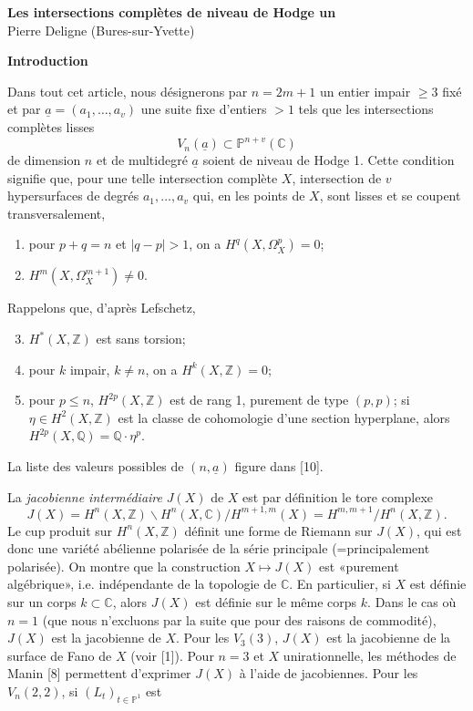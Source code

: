 \documentclass[10pt]{article}
\newcommand{\C}{\mathbb C}
\newcommand{\Pj}{\mathbb P}
\newcommand{\Q}{\mathbb Q}
\newcommand{\Z}{\mathbb Z}
\begin{document}
\fontsize{9.4}{11.15}\selectfont

\begin{center}
{\Large\bfseries Les intersections complètes de niveau de Hodge un}\\[0.45em]
Pierre Deligne (Bures-sur-Yvette)
\end{center}

\begin{center}\bfseries Introduction\end{center}

Dans tout cet article, nous désignerons par \(n=2m+1\) un entier impair \(\geq 3\) fixé et par \(\underline a=(a_1,\ldots,a_v)\) une suite fixe d'entiers \(>1\) tels que les intersections complètes lisses
\[
V_n(\underline a)\subset \Pj^{n+v}(\C)
\]
de dimension \(n\) et de multidegré \(\underline a\) soient de niveau de Hodge 1. Cette condition signifie que, pour une telle intersection complète \(X\), intersection de \(v\) hypersurfaces de degrés \(a_1,\ldots,a_v\) qui, en les points de \(X\), sont lisses et se coupent transversalement,
\begin{enumerate}[label=\alph*)]
\item pour \(p+q=n\) et \(|q-p|>1\), on a \(H^q(X,\Omega_X^p)=0\);
\item \(H^m(X,\Omega_X^{m+1})\ne0\).
\end{enumerate}
Rappelons que, d'après Lefschetz,
\begin{enumerate}[label=\alph*)]
\setcounter{enumi}{2}
\item \(H^*(X,\Z)\) est sans torsion;
\item pour \(k\) impair, \(k\ne n\), on a \(H^k(X,\Z)=0\);
\item pour \(p\le n\), \(H^{2p}(X,\Z)\) est de rang 1, purement de type \((p,p)\); si \(\eta\in H^2(X,\Z)\) est la classe de cohomologie d'une section hyperplane, alors \(H^{2p}(X,\Q)=\Q\cdot\eta^p\).
\end{enumerate}
La liste des valeurs possibles de \((n,\underline a)\) figure dans [10].

La \emph{jacobienne intermédiaire} \(J(X)\) de \(X\) est par définition le tore complexe
\[
J(X)=H^n(X,\Z)\backslash H^n(X,\C)/H^{m+1,m}(X)
     =H^{m,m+1}/H^n(X,\Z).
\]
Le cup produit sur \(H^n(X,\Z)\) définit une forme de Riemann sur \(J(X)\), qui est donc une variété abélienne polarisée de la série principale (=principalement polarisée). On montre que la construction \(X\mapsto J(X)\) est «purement algébrique», i.e. indépendante de la topologie de \(\C\). En particulier, si \(X\) est définie sur un corps \(k\subset\C\), alors \(J(X)\) est définie sur le même corps \(k\). Dans le cas où \(n=1\) (que nous n'excluons par la suite que pour des raisons de commodité), \(J(X)\) est la jacobienne de \(X\). Pour les \(V_3(3)\), \(J(X)\) est la jacobienne de la surface de Fano de \(X\) (voir [1]). Pour \(n=3\) et \(X\) unirationnelle, les méthodes de Manin [8] permettent d'exprimer \(J(X)\) à l'aide de jacobiennes. Pour les \(V_n(2,2)\), si \((L_t)_{t\in\Pj^1}\) est
\end{document}

